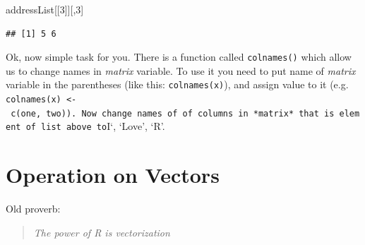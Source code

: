 \documentclass[]{book}
\newenvironment{Shaded}{\begin{snugshade}}{\end{snugshade}}
\newcommand{\DecValTok}[1]{\textcolor[rgb]{0.69,0.50,0.00}{#1}}
\newcommand{\NormalTok}[1]{\textcolor[rgb]{0.12,0.11,0.11}{#1}}
\theoremstyle{definition}
\theoremstyle{definition}
\theoremstyle{definition}
\theoremstyle{remark}
\begin{document}
\begin{Shaded}
\begin{Highlighting}[]
\NormalTok{addressList[[}\DecValTok{3}\NormalTok{]][,}\DecValTok{3}\NormalTok{]}
\end{Highlighting}
\end{Shaded}

\begin{verbatim}
## [1] 5 6
\end{verbatim}

Ok, now simple task for you. There is a function called
\texttt{colnames()} which allow us to change names in \emph{matrix}
variable. To use it you need to put name of \emph{matrix} variable in
the parentheses (like this: \texttt{colnames(x)}), and assign value to
it (e.g.
\texttt{colnames(x)\ \textless{}-\ c(\textquotesingle{}one\textquotesingle{},\ \textquotesingle{}two\textquotesingle{})).\ Now\ change\ names\ of\ of\ columns\ in\ *matrix*\ that\ is\ element\ of\ list\ above\ to}I`,
`Love', `R'.

\section{Operation on Vectors}\label{operation-on-vectors}

Old proverb:

\begin{quote}
\emph{The power of R is vectorization}
\end{quote}
\end{document}
